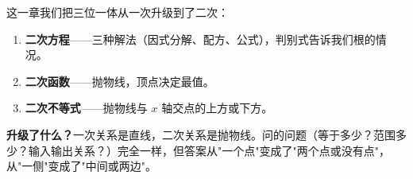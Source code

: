 
这一章我们把三位一体从一次升级到了二次：

\begin{enumerate}
  \item \textbf{二次方程}——三种解法（因式分解、配方、公式），判别式告诉我们根的情况。
  \item \textbf{二次函数}——抛物线，顶点决定最值。
  \item \textbf{二次不等式}——抛物线与 $x$ 轴交点的上方或下方。
\end{enumerate}

\textbf{升级了什么？}一次关系是直线，二次关系是抛物线。问的问题（等于多少？范围多少？输入输出关系？）完全一样，但答案从"一个点"变成了"两个点或没有点"，从"一侧"变成了"中间或两边"。
